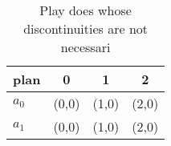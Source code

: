 \documentclass[a4paper]{article}
\begin{document}
\begin{table}
\begin{adjustbox}{width=0.6\columnwidth}
\begin{tabular}{|l|l|l|l|}
\hline
\textbf{plan} & \multicolumn{1}{c|}{\textbf{0}} & \multicolumn{1}{c|}{\textbf{1}} & \multicolumn{1}{c|}{\textbf{2}} \\ \hline
\textbf{$a_0$}  & (0,0) & (1,0) & (2,0) \\ \hline
\textbf{$a_1$}  & (0,0) & (1,0) & (2,0) \\ \hline
\end{tabular}
\end{adjustbox}
\caption{Play does whose discontinuities are not necessari
}
\end{table}
\end{document}
